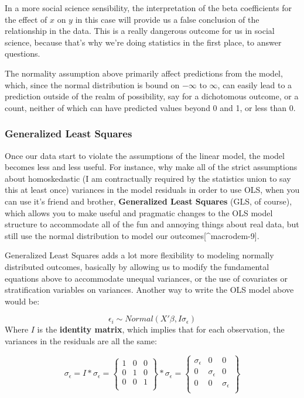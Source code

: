 \documentclass[
]{article}
\begin{document}
In a more social science sensibility, the interpretation of the beta coefficients for the effect of \(x\) on \(y\) in this case will provide us a false conclusion of the relationship in the data. This is a really dangerous outcome for us in social science, because that's why we're doing statistics in the first place, to answer questions.

The normality assumption above primarily affect predictions from the model, which, since the normal distribution is bound on \(-\infty\) to \(\infty\), can easily lead to a prediction outside of the realm of possibility, say for a dichotomous outcome, or a count, neither of which can have predicted values beyond 0 and 1, or less than 0.

\hypertarget{generalized-least-squares}{%
\subsubsection{Generalized Least Squares}\label{generalized-least-squares}}

Once our data start to violate the assumptions of the linear model, the model becomes less and less useful. For instance, why make all of the strict assumptions about homoskedastic (I am contractually required by the statistics union to say this at least once) variances in the model residuals in order to use OLS, when you can use it's friend and brother, \textbf{Generalized Least Squares} (GLS, of course), which allows you to make useful and pragmatic changes to the OLS model structure to accommodate all of the fun and annoying things about real data, but still use the normal distribution to model our outcomes{[}\^{}macrodem-9{]}.

Generalized Least Squares adds a lot more flexibility to modeling normally distributed outcomes, basically by allowing us to modify the fundamental equations above to accommodate unequal variances, or the use of covariates or stratification variables on variances. Another way to write the OLS model above would be:

\[\epsilon_i \sim Normal(X'\beta, I\sigma_\epsilon)\] Where \(I\) is the \textbf{identity matrix}, which implies that for each observation, the variances in the residuals are all the same:

\[
\sigma_{\epsilon}  = I * \sigma_{\epsilon} = \begin{Bmatrix}
1& 0& 0 \\
0& 1& 0 \\
0& 0& 1\\
\end{Bmatrix} *\sigma_{\epsilon} = \begin{Bmatrix}
\sigma_{\epsilon}& 0& 0 \\
0& \sigma_{\epsilon}& 0 \\
0& 0 & \sigma_{\epsilon} \\
\end{Bmatrix}
\]
\end{document}
